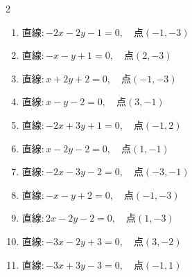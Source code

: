 \begin{multicols}{2}
\begin{enumerate}

  \item $直線:-2x-2y-1=0,\quad 点 ( -1, -3 )$


  \item $直線:-x-y+1=0,\quad 点 ( 2, -3 )$


\columnbreak %

\resetques

  \item $直線:x+2y+2=0,\quad 点 ( -1, -3 )$


  \item $直線:x-y-2=0,\quad 点 ( 3, -1 )$


  \item $直線:-2x+3y+1=0,\quad 点 ( -1, 2 )$


  \item $直線:x-2y-2=0,\quad 点 ( 1, -1 )$


  \item $直線:-2x-3y-2=0,\quad 点 ( -3, -1 )$


  \item $直線:-x-y+2=0,\quad 点 ( -1, -3 )$


  \item $直線:2x-2y-2=0,\quad 点 ( 1, -3 )$


  \item $直線:-3x-2y+3=0,\quad 点 ( 3, -2 )$


  \item $直線:-3x+3y-3=0,\quad 点 ( -1, 1 )$



\end{enumerate}
\end{multicols}
